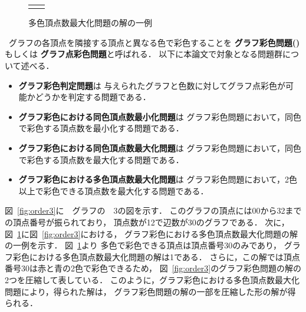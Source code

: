 \begin{figure}[tb]
\begin{tabular}{cc}
\begin{minipage}[t]{0.45\linewidth}
      \caption{多色頂点数最大化問題の解の一例}
      \label{fig:order3mult}
    \end{minipage}
  \end{tabular}
\end{figure}

\, グラフの各頂点を隣接する頂点と異なる色で彩色することを
\textbf{グラフ彩色問題()}もしくは
\textbf{グラフ点彩色問題}と呼ばれる．
以下に本論文で対象となる問題群について述べる．

\begin{itemize}
\item \textbf{グラフ彩色判定問題}は
  与えられたグラフと色数に対してグラフ点彩色が可能かどうかを判定する問題である．
\item \textbf{グラフ彩色における同色頂点数最小化問題}は
  グラフ彩色問題において，同色で彩色する頂点数を最小化する問題である．
\item \textbf{グラフ彩色における同色頂点数最大化問題}は
  グラフ彩色問題において，同色で彩色する頂点数を最大化する問題である．
\item \textbf{グラフ彩色における多色頂点数最大化問題}は
  グラフ彩色問題において，2色以上で彩色できる頂点数を最大化する問題である．
\end{itemize}

図~\ref{fig:order3}に~~グラフの~~3の図を示す．
このグラフの頂点には00から32までの頂点番号が振られており，
頂点数が12で辺数が30のグラフである．
次に，図~\ref{fig:order3mult}に図~\ref{fig:order3}における，
グラフ彩色における多色頂点数最大化問題の解の一例を示す．
図~\ref{fig:order3mult}より
多色で彩色できる頂点は頂点番号30のみであり，
グラフ彩色における多色頂点数最大化問題の解は1である．
さらに，この解では頂点番号30は赤と青の2色で彩色できるため，
図~\ref{fig:order3}のグラフ彩色問題の解の2つを圧縮して表している．
このように，グラフ彩色における多色頂点数最大化問題により，得られた解は，
グラフ彩色問題の解の一部を圧縮した形の解が得られる．


